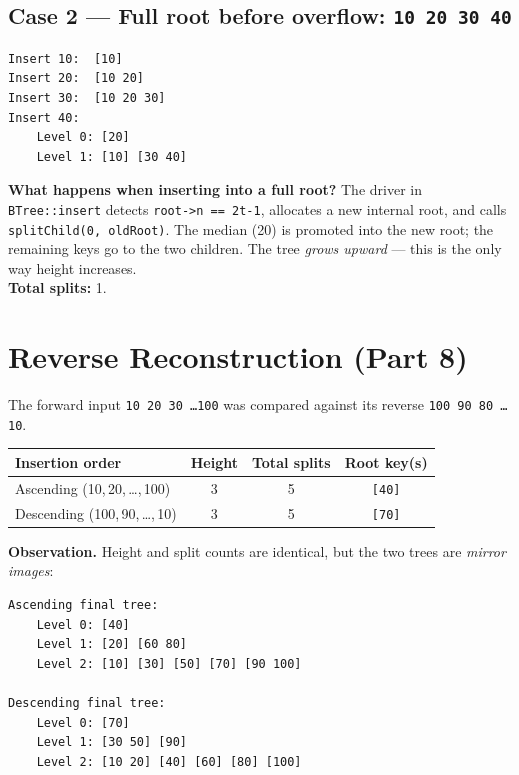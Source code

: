 \documentclass[11pt,a4paper]{article}
\begin{document}
\subsection*{Case 2 --- Full root before overflow: \texttt{10\ 20\ 30\ 40}}

\begin{lstlisting}[style=plain]
Insert 10:  [10]
Insert 20:  [10 20]
Insert 30:  [10 20 30]
Insert 40:
    Level 0: [20]
    Level 1: [10] [30 40]
\end{lstlisting}

\textbf{What happens when inserting into a full root?} The driver in \texttt{BTree::insert} detects \texttt{root->n == 2t-1}, allocates a new internal root, and calls \texttt{splitChild(0, oldRoot)}. The median (20) is promoted into the new root; the remaining keys go to the two children. The tree \emph{grows upward} --- this is the only way height increases.\\[2pt]
\textbf{Total splits:} 1.

\section{Reverse Reconstruction (Part 8)}

The forward input \texttt{10 20 30 \ldots 100} was compared against its reverse \texttt{100 90 80 \ldots 10}.

\begin{center}
\begin{tabular}{lccc}
\toprule
Insertion order & Height & Total splits & Root key(s) \\
\midrule
Ascending  (10,\,20,\,\ldots,\,100) & 3 & 5 & \texttt{[40]} \\
Descending (100,\,90,\,\ldots,\,10) & 3 & 5 & \texttt{[70]} \\
\bottomrule
\end{tabular}
\end{center}

\textbf{Observation.} Height and split counts are identical, but the two trees are \emph{mirror images}:

\begin{lstlisting}[style=plain]
Ascending final tree:
    Level 0: [40]
    Level 1: [20] [60 80]
    Level 2: [10] [30] [50] [70] [90 100]

Descending final tree:
    Level 0: [70]
    Level 1: [30 50] [90]
    Level 2: [10 20] [40] [60] [80] [100]
\end{lstlisting}
\end{document}
